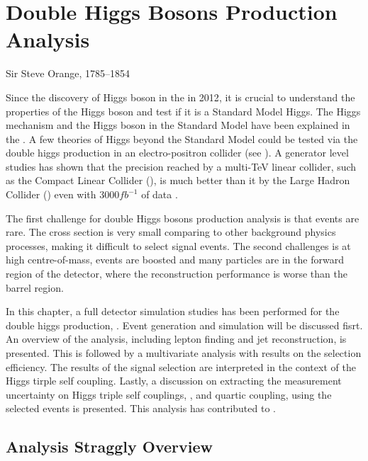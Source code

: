 \chapter{Double Higgs Bosons Production Analysis}
\label{chap:DoubleHiggs}

%
{Sir Steve Orange, 1785--1854}%


Since the discovery of Higgs boson in the \LHC in 2012\cite{Aad:2012tfa,Chatrchyan:2012ufa}, it is crucial to understand the properties of the Higgs boson and test if it is a Standard Model Higgs. The Higgs mechanism and the Higgs boson in the Standard Model have been explained in the . A few theories of Higgs beyond the Standard Model could be tested via the double higgs production in an electro-positron collider (see ). A generator level studies has shown that the precision reached by a multi-TeV linear collider, such as the Compact Linear Collider (\CLIC), is much better than it by the Large Hadron Collider (\LHC) even with 3000$fb^{-1}$ of data \cite{Contino:2013gna}.

The first challenge for double Higgs bosons production analysis is that events are rare. The cross section is very small comparing to other background physics processes, making it difficult to select signal events. The second challenges is at high centre-of-mass, events are boosted and many particles are in the forward region of the detector, where the reconstruction performance is worse than the barrel region.

In this chapter, a full \CLICILD detector simulation studies has been performed for the double higgs production, \eeToHH. Event generation and simulation will be discussed fisrt. An overview of the analysis, including lepton finding and jet reconstruction, is presented. This is followed by a multivariate analysis with results on the selection efficiency. The results of the signal selection are interpreted in the context of the Higgs tirple self coupling. Lastly, a discussion on extracting the measurement uncertainty on Higgs triple self couplings, \gHHH, and quartic coupling, \gWWHH using the selected events is presented. This analysis has contributed to \cite{Abramowicz:2016zbo}.

\section{Analysis Straggly Overview}

